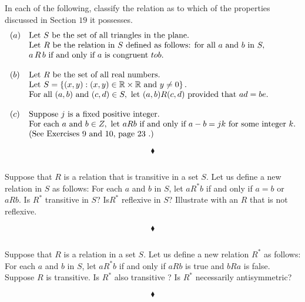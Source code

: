 \subsection{}
\begin{tcolorbox}
 In each of the following, classify the relation as to which of the properties discussed in Section $19$ it possesses.
  \begin{align*}
 \begin{array}{ll} 
(a)& \text{Let } S \text{ be the set of all triangles in the plane.} \\
& \text{Let } R \text{ be the relation in } S \text{ defined as follows: for all } a \text{ and } b \text{ in } S,\\
& a \, R \, b \text{ if and only if } a \text{ is congruent } to b. \\\\
(b) &\text{Let } R \text{ be the set of all real numbers. }\\
&\text{Let } S = \left\{(x, y): (x, y) \in \mathbb{R}\times\mathbb{R} \text{ and }  y \neq 0\right\}.\\
&\text{For all } (a, b) \text{ and } (c, d) \in S, 
\text{ let } (a, b) R (c, d) \text{ provided that } ad = be. \\\\
(c)& \text{Suppose } j \text{ is a fixed positive integer.}\\
& \text{For each } a \text{ and } b\in Z, \text{ let } a R b \text{ if and only if } a - b = jk 
\text{ for some integer } k. \\
&\text{(See Exercises 9 and 10, page 23 .)  }
\end{array}
\end{align*} 
 
\end{tcolorbox}
$$ $$
$$\blacklozenge$$

\subsection{}
\begin{tcolorbox}
Suppose that $R$ is a relation that is transitive in a set $S$. Let us define a new relation in $S$ as follows: For each $a$ and $b$ in $S$, let $a R^{*}b$ if and only if $a=b$ or $a R b$. Is $R^{*}$ transitive in $S$? Is$R^{*}$ reflexive in $S$? Illustrate with an $R$ that is not reflexive. 
\end{tcolorbox}
$$ $$
$$\blacklozenge$$

\subsection{}
\begin{tcolorbox}
Suppose that $R$ is a relation in a set $S$. Let us define a new relation $R^{*}$  as follows: For each $a$ and $b$ in $S$, let $a R^{*}b$ if and only if $a R b$ is true  and $b R a$ is false. Suppose $R$ is transitive.  Is $R^{*}$ also transitive ? Is $R^{*}$ necessarily antisymmetric? 
\end{tcolorbox}
$$ $$
$$\blacklozenge$$


